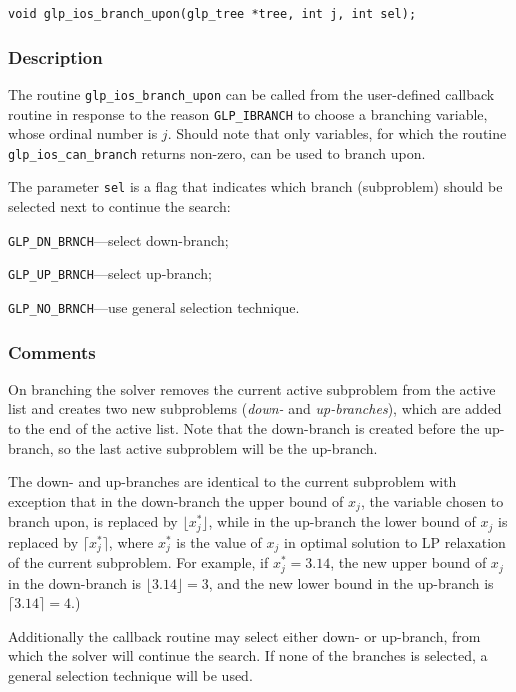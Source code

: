 \begin{verbatim}
void glp_ios_branch_upon(glp_tree *tree, int j, int sel);
\end{verbatim}

\subsubsection*{Description}

The routine \verb|glp_ios_branch_upon| can be called from the
user-defined callback routine in response to the reason
\verb|GLP_IBRANCH| to choose a branching variable, whose ordinal number
is $j$. Should note that only variables, for which the routine
\verb|glp_ios_can_branch| returns non-zero, can be used to branch upon.

The parameter \verb|sel| is a flag that indicates which branch
(subproblem) should be selected next to continue the search:

\verb|GLP_DN_BRNCH|---select down-branch;

\verb|GLP_UP_BRNCH|---select up-branch;

\verb|GLP_NO_BRNCH|---use general selection technique.

\subsubsection*{Comments}

On branching the solver removes the current active subproblem from the
active list and creates two new subproblems ({\it down-} and {\it
up-branches}), which are added to the end of the active list. Note that
the down-branch is created before the up-branch, so the last active
subproblem will be the up-branch.

The down- and up-branches are identical to the current subproblem with
exception that in the down-branch the upper bound of $x_j$, the variable
chosen to branch upon, is replaced by $\lfloor x_j^*\rfloor$, while in
the up-branch the lower bound of $x_j$ is replaced by
$\lceil x_j^*\rceil$, where $x_j^*$ is the value of $x_j$ in optimal
solution to LP relaxation of the current subproblem. For example, if
$x_j^*=3.14$, the new upper bound of $x_j$ in the down-branch is
$\lfloor 3.14\rfloor=3$, and the new lower bound in the up-branch is
$\lceil 3.14\rceil=4$.)

Additionally the callback routine may select either down- or up-branch,
from which the solver will continue the search. If none of the branches
is selected, a general selection technique will be used.

